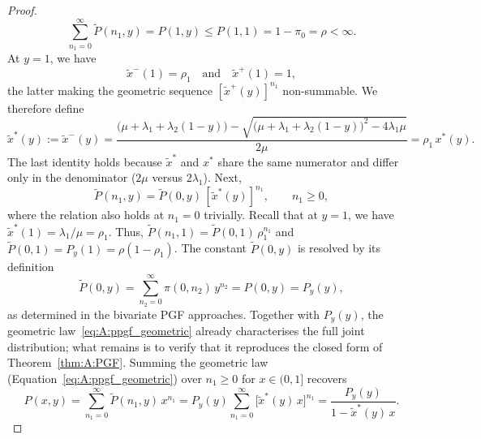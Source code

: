 \begin{proof}
    \begin{equation*}
        \sum_{n_1=0}^{\infty}\widetilde{P}(n_1,y) = P(1,y) \le P(1,1) = 1-\pi_0 = \rho < \infty.
    \end{equation*}
    At $y=1$, we have
    \begin{equation*}
        \widetilde{x}^{-}(1)=\rho_1 \quad \text{and} \quad \widetilde{x}^{+}(1)=1,
    \end{equation*}
    the latter making the geometric sequence $[\widetilde{x}^{+}(y)]^{n_1}$ non-summable. We therefore define
    \begin{equation}
        \widetilde{x}^*(y):=\widetilde{x}^{-}(y) = \frac{\bigl(\mu + \lambda_1 + \lambda_2(1-y)\bigr)
                - \sqrt{\bigl(\mu + \lambda_1 + \lambda_2(1-y)\bigr)^2 - 4\lambda_1\mu}}{2\mu}
        = \rho_1\,x^*(y).
        \label{eq:A:xtildestar}
    \end{equation}
    The last identity holds because $\widetilde{x}^*$ and $x^*$ share the same numerator and differ only in the denominator ($2\mu$ versus $2\lambda_1$). Next,
    \begin{equation}
        \widetilde{P}(n_1, y) = \widetilde{P}(0,y)\,[\widetilde{x}^*(y)]^{n_1},
        \qquad n_1\geq0,
        \label{eq:A:ppgf_geometric}
    \end{equation}
    where the relation also holds at $n_1=0$ trivially.
    Recall that at $y=1$, we have $\widetilde{x}^*(1)=\lambda_1/\mu=\rho_1$. Thus, $\widetilde{P}(n_1,1)=\widetilde{P}(0,1)\,\rho_1^{n_1}$ and $\widetilde{P}(0,1)=P_y(1)=\rho(1-\rho_1)$. The constant $\widetilde{P}(0,y)$ is resolved by its definition
    \begin{equation*}
        \widetilde{P}(0,y) = \sum_{n_2=0}^{\infty}\pi(0,n_2)\,y^{n_2} = P(0,y) = P_y(y),
    \end{equation*}
    as determined in the bivariate PGF approaches.
    Together with $P_y(y)$, the geometric law~\eqref{eq:A:ppgf_geometric} already characterises the full joint distribution; what remains is to verify that it reproduces the closed form of Theorem~\ref{thm:A:PGF}.
    Summing the geometric law (Equation~\eqref{eq:A:ppgf_geometric}) over $n_1 \geq 0$ for $x \in (0,1]$ recovers
    \begin{equation}
        P(x,y) = \sum_{n_1=0}^{\infty}\widetilde{P}(n_1,y)\,x^{n_1}
               = P_y(y)\sum_{n_1=0}^{\infty}\bigl[\widetilde{x}^*(y)\,x\bigr]^{n_1}
               = \frac{P_y(y)}{1-\widetilde{x}^*(y)\,x}.
        \label{eq:A:ppgf_reconstruct}
    \end{equation}

\end{proof}
